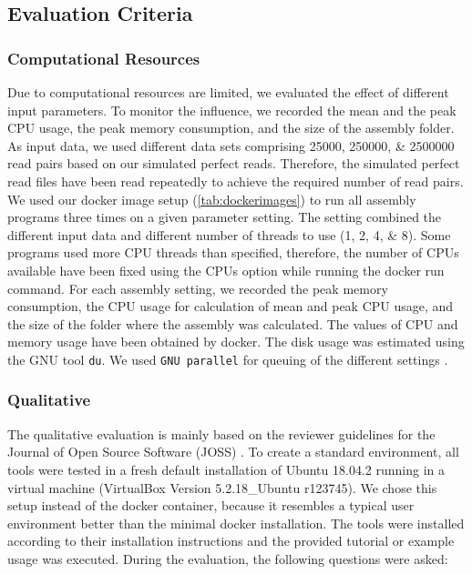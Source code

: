 \documentclass{bmcart}
\begin{document}
\subsection*{Evaluation Criteria}
\subsubsection*{Computational Resources}
Due to computational resources are limited, we evaluated the effect of different input parameters.
To monitor the influence, we recorded the mean and the peak CPU usage, the peak memory consumption, and the size of the assembly folder. 
As input data, we used different data sets comprising \numlist{25000;250000;2500000} read pairs based on our simulated perfect reads.
Therefore, the simulated perfect read files have been read repeatedly to achieve the required number of read pairs.
We used our docker image setup (\cref{tab:dockerimages}) to run all assembly programs three times on a given parameter setting.
The setting combined the different input data and different number of threads to use (\numlist{1;2;4;8}).
Some programs used more CPU threads than specified, therefore, the number of CPUs available have been fixed using the CPUs option while running the docker run command.
For each assembly setting, we recorded the peak memory consumption, the CPU usage for calculation of mean and peak CPU usage, and the size of the folder where the assembly was calculated.
The values of CPU and memory usage have been obtained by docker.
The disk usage was estimated using the GNU tool \texttt{du}.
We used \texttt{GNU parallel} for queuing of the different settings \cite{Tange2011a}.

\subsubsection*{Qualitative}

The qualitative evaluation is mainly based on the reviewer guidelines for the Journal of Open Source Software (JOSS) \cite{joss}.
To create a standard environment, all tools were tested in a fresh default installation of Ubuntu 18.04.2 running in a virtual machine (VirtualBox Version 5.2.18\_Ubuntu r123745). We chose this setup instead of the docker container, because it resembles a typical user environment better than the minimal docker installation. The tools were installed according to their installation instructions and
the provided tutorial or example usage was executed. During the evaluation, the following
questions were asked:
\end{document}

